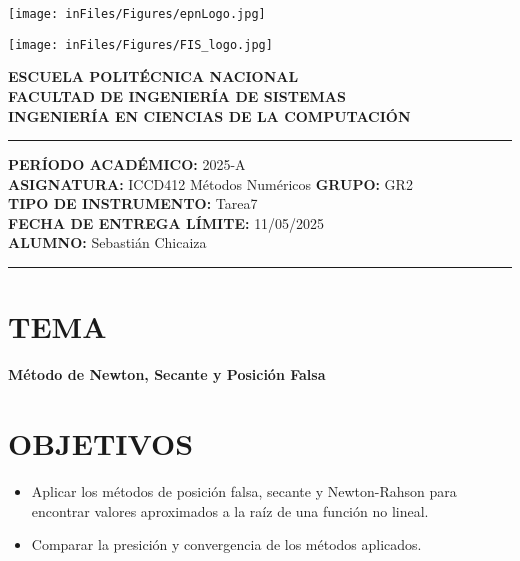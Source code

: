 \documentclass[12pt]{article}
\begin{document}
\begin{minipage}{0.45\textwidth}
    \texttt{[image: inFiles/Figures/epnLogo.jpg]}
\end{minipage}
\hfill
\begin{minipage}{0.45\textwidth}
    \raggedleft
    \texttt{[image: inFiles/Figures/FIS\_logo.jpg]}
\end{minipage}

\vspace{0.5cm}

\begin{center}
    \textbf{ESCUELA POLITÉCNICA NACIONAL}\\[0.2cm]
    \textbf{FACULTAD DE INGENIERÍA DE SISTEMAS}\\[0.2cm]
    \textbf{INGENIERÍA EN CIENCIAS DE LA COMPUTACIÓN}
\end{center}

\vspace{0.5cm}
\hrule
\vspace{0.5cm}

\noindent\textbf{PERÍODO ACADÉMICO:} 2025-A\\[0.2cm]
\noindent\textbf{ASIGNATURA:} ICCD412 Métodos Numéricos \hfill \textbf{GRUPO:} GR2\\[0.2cm]
\noindent\textbf{TIPO DE INSTRUMENTO:} Tarea7\\[0.2cm]
\noindent\textbf{FECHA DE ENTREGA LÍMITE:} {11/05/2025}\\[0.2cm]
\noindent\textbf{ALUMNO:} {Sebastián Chicaiza}

\vspace{0.5cm}
\hrule
\vspace{1cm}


\section*{TEMA}

\begin{center}
    \Large\textbf{Método de Newton, Secante y Posición Falsa}
\end{center}
\vspace{0.5cm}

\section*{OBJETIVOS}
\begin{itemize}
    \item {Aplicar los métodos de posición falsa, secante y Newton-Rahson para encontrar valores aproximados a la raíz de una función no lineal.}
    \item {Comparar la presición y convergencia de los métodos aplicados.}
\end{itemize}
\vspace{0.5cm}
\end{document}

